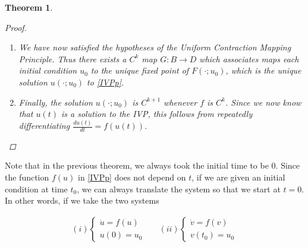 \documentclass{article}
\newtheorem{theorem}{Theorem}[section]
\begin{document}
\begin{theorem}
\begin{proof}
\begin{enumerate}
\begin{align*}
\frac{||F(u + h) - F(u) - L(h) ||}{||h||} 
&\leq \frac{1}{||h||}
\sup_{|t| \leq r} \left| \int_0^t [ f(u(\tau) + h(\tau)) - f(u(\tau))] d\tau - \int_0^t Df(u(\tau)) h(\tau) d \tau \right| \\
&= \frac{1}{||h||}
\sup_{|t| \leq r} \left| \int_0^t [ f(u(\tau) + h(\tau)) - f(u(\tau)) - Df(u(\tau))h(\tau)] d\tau\right| \\
&\leq \int_0^r \frac{ | f(u(\tau) + h(\tau)) - f(u(\tau)) - Df(u(\tau))h(\tau)|}{|h(\tau)|} d\tau
\end{align*}

as $||h|| \rightarrow 0$, $|h(\tau)| \rightarrow 0$, thus the RHS of this goes to 0 since $f$ is continuously differentiable and we are on a closed interval $[0, r]$. We can repeat this to conclude that $F$ is $C^k$.

\item We have now satisfied the hypotheses of the Uniform Contraction Mapping Principle. Thus there exists a $C^k$ map $G: B \rightarrow D$ which associates maps each initial condition $u_0$ to the unique fixed point of $F(\cdot; u_0)$, which is the unique solution $u(\cdot; u_0)$ to \eqref{IVPp}. 

\item Finally, the solution $u(\cdot; u_0)$ is $C^{k+1}$ whenever $f$ is $C^k$. Since we now know that $u(t)$ is a solution to the IVP, this follows from repeatedly differentiating $\frac{du(t)}{dt} = f(u(t))$.

\end{enumerate}
\end{proof}
\end{theorem}

Note that in the previous theorem, we always took the initial time to be 0. Since the function $f(u)$ in \eqref{IVPp} does not depend on $t$, if we are given an initial condition at time $t_0$, we can always translate the system so that we start at $t = 0$. In other words, if we take the two systems

\begin{align*}
(i)\begin{cases}
\dot{u} = f(u) \\
u(0) = u_0
\end{cases}&&
(ii)\begin{cases}
\dot{v} = f(v) \\
v(t_0) = u_0
\end{cases}
\end{align*}
\end{document}
